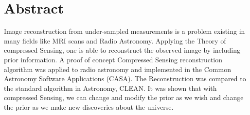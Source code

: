 \section*{Abstract}
Image reconstruction from under-sampled measurements is a problem existing in many fields like MRI scans and Radio Astronomy. Applying the Theory of compressed Sensing, one is able to reconstruct the observed image by including prior information. A proof of concept Compressed Sensing reconstruction algorithm was applied to radio astronomy and implemented in the Common Astronomy Software Applications (CASA). The Reconstruction was compared to the standard algorithm in Astronomy, CLEAN. It was shown that with compressed Sensing, we can change and modify the prior as we wish and change the prior as we make new discoveries about the universe.




